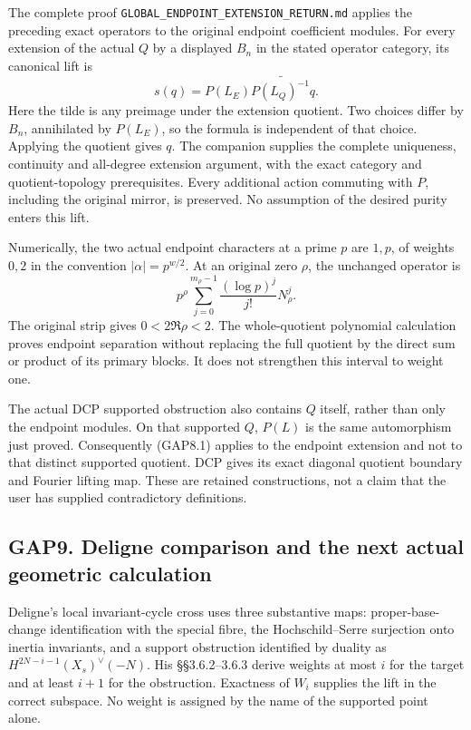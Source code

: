 The complete proof \nolinkurl{GLOBAL_ENDPOINT_EXTENSION_RETURN.md} applies the
preceding exact operators to the original endpoint coefficient modules.
For every extension of the actual \(Q\) by a displayed \(B_n\) in the
stated operator category, its canonical lift is \[
s(q)=P(L_E)\widetilde{P(L_Q)^{-1}q}.
\tag{GAP8.1}
\] Here the tilde is any preimage under the extension quotient. Two
choices differ by \(B_n\), annihilated by \(P(L_E)\), so the formula is
independent of that choice. Applying the quotient gives \(q\). The
companion supplies the complete uniqueness, continuity and all-degree
extension argument, with the exact category and quotient-topology
prerequisites. Every additional action commuting with \(P\), including
the original mirror, is preserved. No assumption of the desired purity
enters this lift.

Numerically, the two actual endpoint characters at a prime \(p\) are
\(1,p\), of weights \(0,2\) in the convention \(|\alpha|=p^{w/2}\). At
an original zero \(\rho\), the unchanged operator is \[
p^\rho\sum_{j=0}^{m_\rho-1}\frac{(\log p)^j}{j!}N_\rho^j.
\tag{GAP8.2}
\] The original strip gives \(0<2\Re\rho<2\). The whole-quotient
polynomial calculation proves endpoint separation without replacing the
full quotient by the direct sum or product of its primary blocks. It
does not strengthen this interval to weight one.

The actual DCP supported obstruction also contains \(Q\) itself, rather
than only the endpoint modules. On that supported \(Q\), \(P(L)\) is the
same automorphism just proved. Consequently (GAP8.1) applies to the
endpoint extension and not to that distinct supported quotient. DCP
gives its exact diagonal quotient boundary and Fourier lifting map.
These are retained constructions, not a claim that the user has supplied
contradictory definitions.

\subsection{GAP9. Deligne comparison and the next actual geometric
calculation}\label{gap9.-deligne-comparison-and-the-next-actual-geometric-calculation}

Deligne's local invariant-cycle cross uses three substantive maps:
proper-base-change identification with the special fibre, the
Hochschild--Serre surjection onto inertia invariants, and a support
obstruction identified by duality as \(H^{2N-i-1}(X_s)^\vee(-N)\). His
§§3.6.2--3.6.3 derive weights at most \(i\) for the target and at least
\(i+1\) for the obstruction. Exactness of \(W_i\) supplies the lift in
the correct subspace. No weight is assigned by the name of the supported
point alone.

